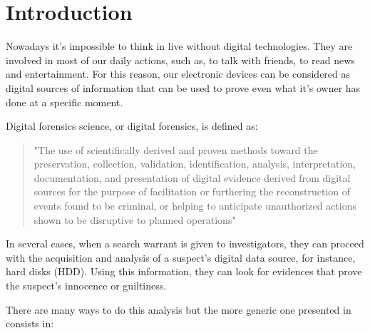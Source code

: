 \cleardoublepage
{}
\chapter*{Introduction}

Nowadays it's impossible to think in live without digital technologies. They
are involved in most of our daily actions, such as, to talk with friends, to
read news and entertainment. For this reason, our electronic devices can be
considered as digital sources of information that can be used to prove even
what it's owner has done at a specific moment.

Digital forensics science, or digital forensics, is defined as:

\begin{quote}
"The use of scientifically derived and proven methods toward the preservation,
collection, validation, identification, analysis, interpretation,
documentation, and presentation of digital evidence derived from digital
sources for the purpose of facilitation or furthering the reconstruction of
events found to be criminal, or helping to anticipate unauthorized actions
shown to be disruptive to planned operations" \cite{DFRWS-df-road-map}
\end{quote}

In several cases, when a search warrant is given to investigators, they can
proceed with the acquisition and analysis of a suspect's digital data source,
for instance, hard disks (HDD). Using this information, they can look for
evidences that prove the suspect's innocence or guiltiness.

There are many ways to do this analysis but the more generic one presented in
\cite{ds-phases} consists in:

